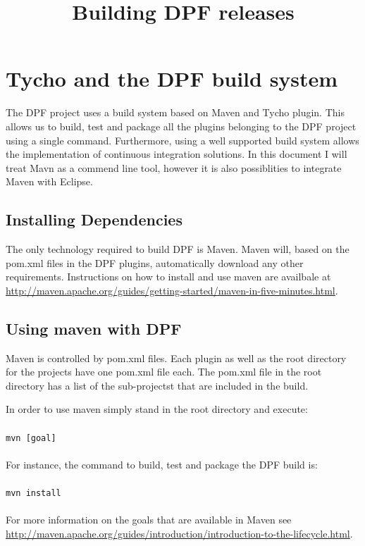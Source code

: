 \documentclass[a4paper]{article}
\title{Building DPF releases}
\newcommand{\code}[1]{\\ \\ \texttt{#1} \\ \\ }
\begin{document}
\maketitle

\section{Tycho and the DPF build system}

The DPF project uses a build system based on Maven and Tycho plugin. This allows us to build, test and package all the plugins belonging to the DPF
project using a single command. Furthermore, using a well supported build system allows the implementation of continuous integration solutions.
In this document I will treat Mavn as a commend line tool, however it is also possiblities to integrate Maven with Eclipse.

\subsection{Installing Dependencies}

The only technology required to build DPF is Maven. Maven will, based on the pom.xml files in the DPF plugins, automatically download
any other requirements. Instructions on how to install and use maven are availbale at \url{http://maven.apache.org/guides/getting-started/maven-in-five-minutes.html}. 

\subsection{Using maven with DPF}

Maven is controlled by pom.xml files. Each plugin as well as the root directory for the projects have one pom.xml file each. The pom.xml
file in the root directory has a list of the sub-projectst that are included in the build.

In order to use maven simply stand in the root directory and execute: \code{mvn [goal]} 
For instance, the command  to build, test and package the DPF build
is: \code{mvn install}
For more information on the goals that are available in Maven see \url{http://maven.apache.org/guides/introduction/introduction-to-the-lifecycle.html}.



\end{document}
